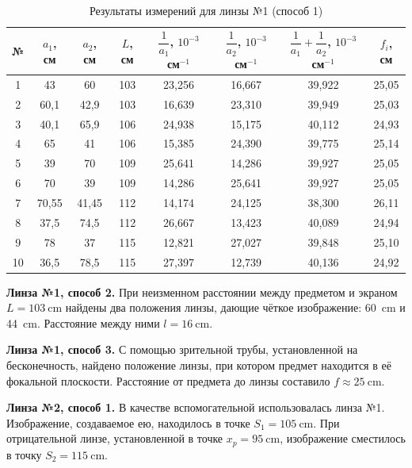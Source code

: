 \documentclass[14pt,a4paper]{extarticle}
\begin{document}
\begin{table}[htbp]
\caption{Результаты измерений для линзы №1 (способ 1)}
\label{tab:lens1}
\centering
\small
\setlength{\tabcolsep}{4pt}
\begin{tabular}{
S[table-format=2.0]
S[table-format=2.2]
S[table-format=2.2]
S[table-format=3.0]
S[table-format=2.3]
S[table-format=2.3]
S[table-format=2.3]
S[table-format=2.2]
}
\toprule
{№} & {$a_1$, см} & {$a_2$, см} & {$L$, см} & {$\dfrac{1}{a_1}$, $10^{-3}$ см$^{-1}$} & {$\dfrac{1}{a_2}$, $10^{-3}$ см$^{-1}$} & {$\dfrac{1}{a_1}+\dfrac{1}{a_2}$, $10^{-3}$ см$^{-1}$} & {$f_i$, см} \\
 & 43 & 60 & 103 & 23,256 & 16,667 & 39,922 & 25,05 \\
2 & 60,1 & 42,9 & 103 & 16,639 & 23,310 & 39,949 & 25,03 \\
3 & 40,1 & 65,9 & 106 & 24,938 & 15,175 & 40,112 & 24,93 \\
4 & 65 & 41 & 106 & 15,385 & 24,390 & 39,775 & 25,14 \\
5 & 39 & 70 & 109 & 25,641 & 14,286 & 39,927 & 25,05 \\
6 & 70 & 39 & 109 & 14,286 & 25,641 & 39,927 & 25,05 \\
7 & 70,55 & 41,45 & 112 & 14,174 & 24,125 & 38,300 & 26,11 \\
8 & 37,5 & 74,5 & 112 & 26,667 & 13,423 & 40,089 & 24,94 \\
9 & 78 & 37 & 115 & 12,821 & 27,027 & 39,848 & 25,10 \\
10 & 36,5 & 78,5 & 115 & 27,397 & 12,739 & 40,136 & 24,92 \\
\bottomrule
\end{tabular}
\end{table}

\textbf{Линза №1, способ 2.} При неизменном расстоянии между предметом и экраном $L = \SI{103}{\cm}$ найдены два положения линзы, дающие чёткое изображение: \SI{60}{\cm} и \SI{44}{\cm}. Расстояние между ними $l = \SI{16}{\cm}$.

\textbf{Линза №1, способ 3.} С помощью зрительной трубы, установленной на бесконечность, найдено положение линзы, при котором предмет находится в её фокальной плоскости. Расстояние от предмета до линзы составило $f \approx \SI{25}{\cm}$.

\textbf{Линза №2, способ 1.} В качестве вспомогательной использовалась линза №1. Изображение, создаваемое ею, находилось в точке $S_1 = \SI{105}{\cm}$. При отрицательной линзе, установленной в точке $x_p = \SI{95}{\cm}$, изображение сместилось в точку $S_2 = \SI{115}{\cm}$.
\end{document}
